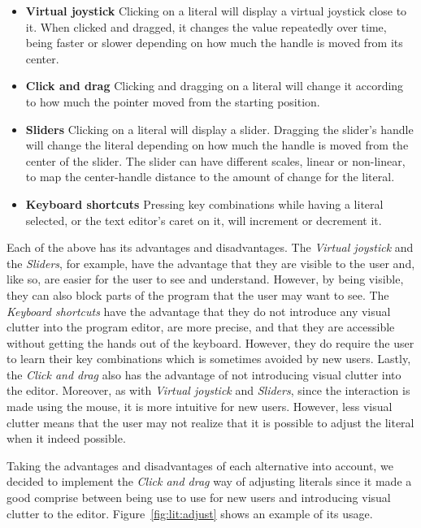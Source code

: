 \begin{itemize}
  \item {\bf Virtual joystick} Clicking on a literal will display a virtual joystick close to it. When clicked and dragged, it changes the value repeatedly over time, being faster or slower depending on how much the handle is moved from its center.
  \item {\bf Click and drag} Clicking and dragging on a literal will change it according to how much the pointer moved from the starting position.
  \item {\bf Sliders} Clicking on a literal will display a slider. Dragging the slider's handle will change the literal depending on how much the handle is moved from the center of the slider. The slider can have different scales, linear or non-linear, to map the center-handle distance to the amount of change for the literal.
  \item {\bf Keyboard shortcuts} Pressing key combinations while having a literal selected, or the text editor's caret on it, will increment or decrement it.
\end{itemize}

Each of the above has its advantages and disadvantages.
The {\it Virtual joystick} and the {\it Sliders}, for example, have the advantage that they are visible to the user and, like so, are easier for the user to see and understand.
However, by being visible, they can also block parts of the program that the user may want to see.
The {\it Keyboard shortcuts} have the advantage that they do not introduce any visual clutter into the program editor, are more precise, and that they are accessible without getting the hands out of the keyboard.
However, they do require the user to learn their key combinations which is sometimes avoided by new users.
Lastly, the {\it Click and drag} also has the advantage of not introducing visual clutter into the editor.
Moreover, as with {\it Virtual joystick} and {\it Sliders}, since the interaction is made using the mouse, it is more intuitive for new users.
However, less visual clutter means that the user may not realize that it is possible to adjust the literal when it indeed possible.

Taking the advantages and disadvantages of each alternative into account, we decided to implement the {\it Click and drag} way of adjusting literals since it made a good comprise between being use to use for new users and introducing visual clutter to the editor.
Figure~\ref{fig:lit:adjust} shows an example of its usage.

